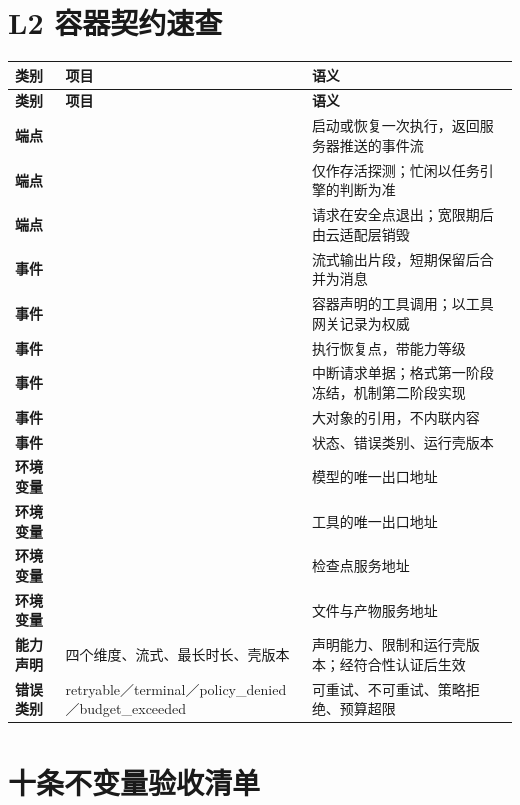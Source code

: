 \section{L2 容器契约速查}
\label{app:l2}

\begin{longtable}{@{}>{\bfseries}L{2.0cm}L{3.8cm}L{\dimexpr\textwidth-5.8cm-4\tabcolsep\relax}@{}}
  \toprule
  \textbf{类别} & \textbf{项目} & \textbf{语义}\\
  \midrule
  \endfirsthead
  \toprule
  \textbf{类别} & \textbf{项目} & \textbf{语义}\\
  \midrule
  \endhead
  端点 &  & 启动或恢复一次执行，返回服务器推送的事件流\\
  端点 &  & 仅作存活探测；忙闲以任务引擎的判断为准\\
  端点 &  & 请求在安全点退出；宽限期后由云适配层销毁\\
  事件 &  & 流式输出片段，短期保留后合并为消息\\
  事件 &  & 容器声明的工具调用；以工具网关记录为权威\\
  事件 &  & 执行恢复点，带能力等级\\
  事件 &  & 中断请求单据；格式第一阶段冻结，机制第二阶段实现\\
  事件 &  & 大对象的引用，不内联内容\\
  事件 &  & 状态、错误类别、运行壳版本\\
  环境变量 &  & 模型的唯一出口地址\\
  环境变量 &  & 工具的唯一出口地址\\
  环境变量 &  & 检查点服务地址\\
  环境变量 &  & 文件与产物服务地址\\
  能力声明 & 四个维度、流式、最长时长、壳版本 & 声明能力、限制和运行壳版本；经符合性认证后生效\\
  错误类别 & retryable／terminal／policy\_denied／budget\_exceeded & 可重试、不可重试、策略拒绝、预算超限\\
  \bottomrule
\end{longtable}

\section{十条不变量验收清单}
\label{app:checklist}


